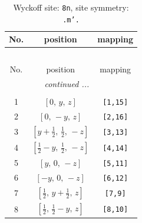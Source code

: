 \documentclass[fleqn,8pt]{jsarticle}
\begin{document}
\begin{longtable}{ccc}
\caption{Wyckoff site: {\tt 8n}, site symmetry: {\tt .m'.}}
 \\
 \hline \hline
No. & position & mapping \\ \hline \endfirsthead

\multicolumn{2}{l}{\tablename\ \thetable{}} \\
 \hline \hline
No. & position & mapping \\ \hline \endhead

 \hline \hline
\multicolumn{2}{r}{\footnotesize\it continued ...} \\ \endfoot

 \hline \hline
\multicolumn{2}{r}{} \\ \endlastfoot

1 & $\left[ 0,\, y,\, z \right]$ & {\tt [1,15]} \\ \hline
2 & $\left[ 0,\, - y,\, z \right]$ & {\tt [2,16]} \\ \hline
3 & $\left[ y + \frac{1}{2},\, \frac{1}{2},\, - z \right]$ & {\tt [3,13]} \\ \hline
4 & $\left[ \frac{1}{2} - y,\, \frac{1}{2},\, - z \right]$ & {\tt [4,14]} \\ \hline
5 & $\left[ y,\, 0,\, - z \right]$ & {\tt [5,11]} \\ \hline
6 & $\left[ - y,\, 0,\, - z \right]$ & {\tt [6,12]} \\ \hline
7 & $\left[ \frac{1}{2},\, y + \frac{1}{2},\, z \right]$ & {\tt [7,9]} \\ \hline
8 & $\left[ \frac{1}{2},\, \frac{1}{2} - y,\, z \right]$ & {\tt [8,10]} \\
\end{longtable}
\renewcommand{\arraystretch}{1.2}
\end{document}
